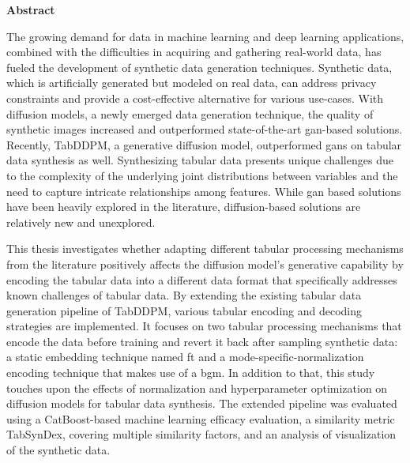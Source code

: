 \thispagestyle{empty}
\begin{center}
	\textbf{\LARGE Abstract}
\end{center}
The growing demand for data in machine learning and deep learning applications, combined with the difficulties in acquiring and gathering real-world data, has fueled the development of synthetic data generation techniques.
Synthetic data, which is artificially generated but modeled on real data, can address privacy constraints and provide a cost-effective alternative for various use-cases.
With diffusion models, a newly emerged data generation technique, the quality of synthetic images increased and outperformed state-of-the-art \gls{gan}-based solutions. 
Recently, TabDDPM, a generative diffusion model, outperformed \glspl{gan} on tabular data synthesis as well.
Synthesizing tabular data presents unique challenges due to the complexity of the underlying joint distributions between variables and the need to capture intricate relationships among features.
While \gls{gan} based solutions have been heavily explored in the literature, diffusion-based solutions are relatively new and unexplored.


This thesis investigates whether adapting different tabular processing mechanisms from the literature positively affects the diffusion model's generative capability by encoding the tabular data into a different data format that specifically addresses known challenges of tabular data.
By extending the existing tabular data generation pipeline of TabDDPM, various tabular encoding and decoding strategies are implemented.
It focuses on two tabular processing mechanisms that encode the data before training and revert it back after sampling synthetic data: a static embedding technique named \gls{ft} and a mode-specific-normalization encoding technique that makes use of a \gls{bgm}.
In addition to that, this study touches upon the effects of normalization and hyperparameter optimization on diffusion models for tabular data synthesis.
The extended pipeline was evaluated using a CatBoost-based machine learning efficacy evaluation, a similarity metric TabSynDex, covering multiple similarity factors, and an analysis of visualization of the synthetic data.


